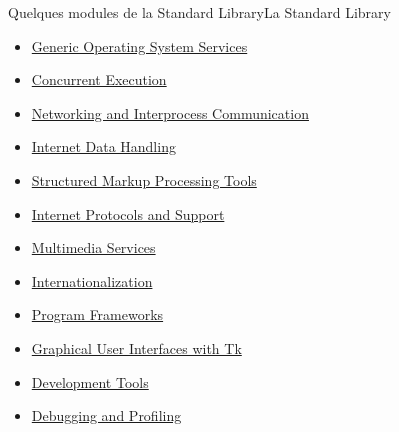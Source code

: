 \documentclass{beamer}
\begin{document}
\begin{frame}{Quelques modules de la Standard Library}{La Standard Library}
\begin{tiny}
\begin{itemize}
                \item \href{https://docs.python.org/3/library/allos.html}{Generic Operating System Services}
                \item \href{https://docs.python.org/3/library/concurrency.html}{Concurrent Execution}
                \item \href{https://docs.python.org/3/library/ipc.html}{Networking and Interprocess Communication}
                \item \href{https://docs.python.org/3/library/netdata.html}{Internet Data Handling}
                \item \href{https://docs.python.org/3/library/markup.html}{Structured Markup Processing Tools}
                \item \href{https://docs.python.org/3/library/internet.html}{Internet Protocols and Support}
                \item \href{https://docs.python.org/3/library/mm.html}{Multimedia Services}
                \item \href{https://docs.python.org/3/library/i18n.html}{Internationalization}
                \item \href{https://docs.python.org/3/library/frameworks.html}{Program Frameworks}
                \item \href{https://docs.python.org/3/library/tk.html}{Graphical User Interfaces with Tk}
                \item \href{https://docs.python.org/3/library/development.html}{Development Tools}
                \item \href{https://docs.python.org/3/library/debug.html}{Debugging and Profiling}
            \end{itemize}
        \end{tiny}
    \end{frame}
\end{document}
